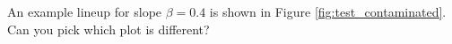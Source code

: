 \documentclass{article}
\begin{document}

An example lineup for slope $\beta=0.4$ is shown in Figure \ref{fig:test_contaminated}.  Can you pick which plot is different? %

\end{document}
